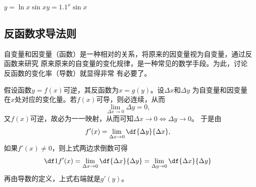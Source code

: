 \begin{shaded}
\begin{center}
		\quad
		
		$y=\ln x\sin x$\hspace{5cm}$y=1.1^x\sin x$
	\end{center}
\end{shaded}

\subsection{反函数求导法则}

自变量和因变量（函数）是一种相对的关系，将原来的因变量视为自变量，通过反函数来研究
原来原来的自变量的变化规律，是一种常见的数学手段。为此，讨论反函数的变化率（导数）就显得非常
有必要了。

假设函数$y=f(x)$可逆，其反函数为$x=g(y)$。设$\Delta x$和$\Delta y$
为自变量和因变量在$x$处对应的变化量。若$f(x)$可导，则必连续，从而
$$\lim\limits_{\Delta x\to 0}\Delta y=0,$$
又$f(x)$可逆，故必为一一映射，从而可知$\Delta x\to0\Leftrightarrow\Delta y\to0$。
于是由
$$f'(x)=\lim\limits_{\Delta x\to 0}\df{\Delta y}{\Delta x},$$
如果$f'(x)\ne 0$，则上式两边求倒数可得
$$
	\df1{f'(x)}=\lim\limits_{\Delta x\to 0}\df{\Delta x}{\Delta y}
	=\lim\limits_{\Delta y\to 0}\df{\Delta x}{\Delta y}
$$
再由导数的定义，上式右端就是$g'(y)$。


